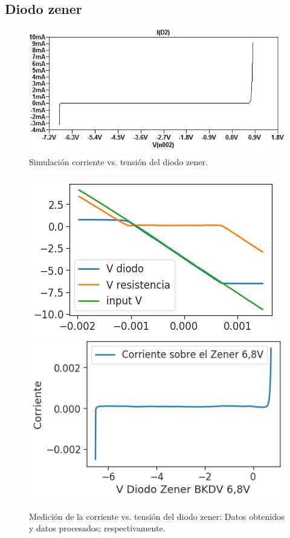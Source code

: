 \subsection*{\color{orange}Diodo zener}

\begin{figure}[H]
\centering
\includegraphics[scale=0.62]{../EJ1/DiodoZener/simulacionZener}
\caption{Simulaci\'on corriente vs. tensi\'on del diodo zener.}
\label{med2a}
\end{figure}

\begin{figure}[H]
\centering
\includegraphics[scale=0.5]{../EJ1/DiodoZener/datosOsciloscopioZener}
\includegraphics[scale=0.5]{../EJ1/DiodoZener/zenerMedido}
\caption{Medici\'on de la corriente vs. tensi\'on del diodo zener: Datos obtenidos y datos procesados; respectivamente.}
\label{med2b}
\end{figure}

